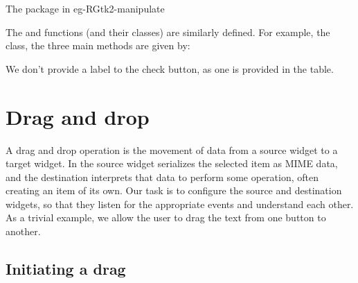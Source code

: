 \begin{example}{The  package in }{eg-RGtk2-manipulate}
%

The  and  functions (and their
classes) are similarly defined. For example, the 
class, the three main methods are given by:
\begin{Schunk}
\end{Schunk}
%
We don't provide a label to the check button, as one is provided in
the table.


\end{example}

\section{Drag and drop}
\label{sec:RGtk2:dnd}


A drag and drop operation is the movement of data from a source widget
to a target widget. In \GTK{} the source widget serializes the
selected item as MIME data, and the destination interprets that data
to perform some operation, often creating an item of its own. Our task
is to configure the source and destination widgets, so that they
listen for the appropriate events and understand each other. As a
trivial example, we allow the user to drag the text from one button to
another.

\subsection{Initiating a drag}

